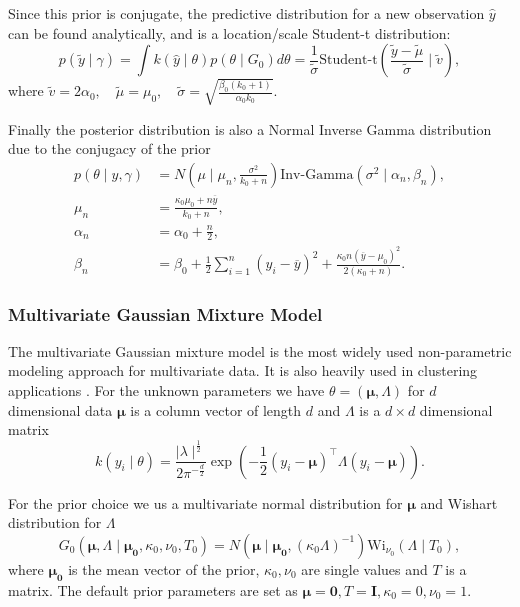 \documentclass[nojss]{jss}
\begin{document}
Since this prior is conjugate, the predictive distribution for a new observation $\hat{y}$ can be found analytically, and is a location/scale Student-t distribution:
\begin{equation}
p(\tilde{y} \mid \gamma) = \int k(\hat{y}\mid\theta) p(\theta \mid G_0) d\theta = \frac{1}{\tilde{\sigma}} \text{Student-t} \left( \frac{ \tilde{y} - \tilde{\mu}}{\tilde{\sigma}} \mid \tilde{v}\right),
\end{equation}
where $\tilde{v} = 2 \alpha_0, \quad \tilde{\mu} = \mu_0, \quad \tilde{\sigma} = \sqrt{ \frac{\beta_0 (k_0 + 1)}{\alpha_0 k_0}}$.

Finally the posterior distribution is also a Normal Inverse Gamma distribution due to the conjugacy of the prior
\begin{align*}
p(\theta \mid y, \gamma) & = N ( \mu \mid \mu _n , \frac{\sigma ^2}{k_0 + n}  ) \text{Inv-Gamma} ( \sigma ^2 \mid \alpha _n , \beta _n), \\
\mu _n & = \frac{\kappa _0 \mu _0 + n \overline{y}}{k_0 + n}, \\
\alpha _n & = \alpha _0 + \frac{n}{2}, \\
\beta _n & = \beta _0 + \frac{1}{2} \sum _{i=1} ^n (y_i - \overline{y} ) ^2 + \frac{\kappa _0 n (\overline{y} - \mu _0)^2}{2(\kappa _0 + n)} .
\end{align*}

\subsubsection{Multivariate Gaussian Mixture Model}
The multivariate Gaussian mixture model is the most widely used non-parametric modeling approach for multivariate data. It is also heavily used in clustering applications \citep{maceachern_estimating_1998}. For the unknown parameters we have $\theta = ( \boldsymbol{\mu}, \Lambda )$ for $d$ dimensional data $\boldsymbol{\mu}$ is a column vector of length $d$ and $\Lambda$ is a $d \times d$ dimensional matrix
\begin{equation}
k(y_i \mid \theta) = \frac{\mid \lambda \mid ^{\frac{1}{2}}}{2 \pi ^{- \frac{d}{2}}} \exp \left( - \frac{1}{2} (y_i - \boldsymbol{\mu})^\top \Lambda (y_i - \boldsymbol{\mu})  \right).
\end{equation}

For the prior choice we us a multivariate normal distribution for $\boldsymbol{\mu}$ and Wishart distribution for $\Lambda$
\begin{equation}
G_0 (\boldsymbol{\mu} , \Lambda \mid  \boldsymbol{\mu _0} , \kappa _0, \nu _0, T_0)  = N ( \boldsymbol{\mu} \mid \boldsymbol{\mu _0} , (\kappa _0 \Lambda )^{-1} ) \text{Wi} _{\nu _0} (\Lambda \mid T_0),
\end{equation}
where $\boldsymbol{\mu _0}$ is the mean vector of the prior, $\kappa _0, \nu _0$ are single values and $T$ is a matrix. The default prior parameters are set as $\boldsymbol{\mu} = \mathbf{0}, T = \mathbf{I}, \kappa_0 = 0, \nu_0 = 1$.
\end{document}
